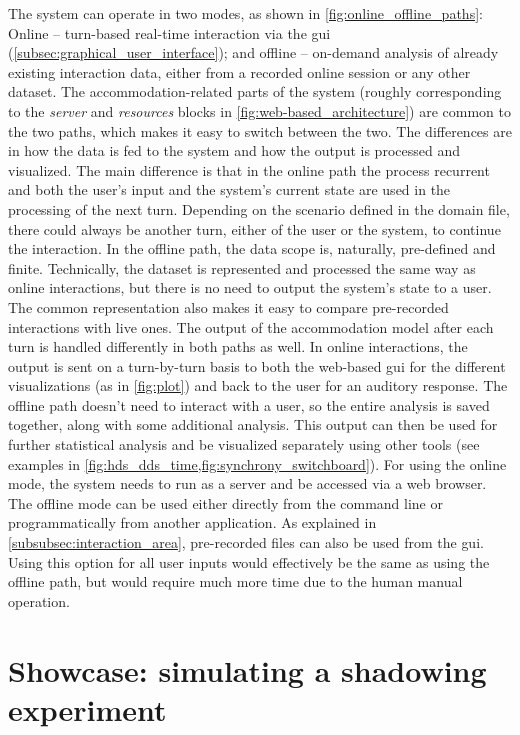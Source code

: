 The system can operate in two modes, as shown in \cref{fig:online_offline_paths}:
Online -- turn-based real-time interaction via the \ac{gui} (\cref{subsec:graphical_user_interface}); and offline -- on-demand analysis of already existing interaction data, either from a recorded online session or any other dataset.
The accommodation-related parts of the system (roughly corresponding to the \emph{server} and \emph{resources} blocks in \cref{fig:web-based_architecture}) are common to the two paths, which makes it easy to switch between the two.
The differences are in how the data is fed to the system and how the output is processed and visualized.
The main difference is that in the online path the process recurrent and both the user's input and the system's current state are used in the processing of the next turn.
Depending on the scenario defined in the domain file, there could always be another turn, either of the user or the system, to continue the interaction.
In the offline path, the data scope is, naturally, pre-defined and finite.
Technically, the dataset is represented and processed the same way as online interactions, but there is no need to output the system's state to a user.
The common representation also makes it easy to compare pre-recorded interactions with live ones.
The output of the accommodation model after each turn is handled differently in both paths as well.
In online interactions, the output is sent on a turn-by-turn basis to both the web-based \ac{gui} for the different visualizations (as in \cref{fig:plot}) and back to the user for an auditory response.
The offline path doesn't need to interact with a user, so the entire analysis is saved together, along with some additional analysis.
This output can then be used for further statistical analysis and be visualized separately using other tools (see examples in \cref{fig:hds_dds_time,fig:synchrony_switchboard}).
For using the online mode, the system needs to run as a server and be accessed via a web browser.
The offline mode can be used either directly from the command line or programmatically from another application.
As explained in \cref{subsubsec:interaction_area}, pre-recorded files can also be used from the \ac{gui}.
Using this option for all user inputs would effectively be the same as using the offline path, but would require much more time due to the human manual operation.

\section{Showcase: simulating a shadowing experiment}
\label{sec:showcase}

